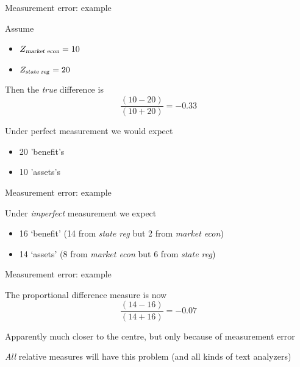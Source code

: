 \documentclass{hertieteaching}
\begin{document}
\begin{frame}{Measurement error: example}
\protect\hypertarget{measurement-error-example-2}{}

Assume

\begin{itemize}
\item
  \(Z_{\text{\textsl{market econ}}} = 10\)\item
  \(Z_{\text{\textsl{state reg}}}=20\)
\end{itemize}

Then the \emph{true} difference is \[\frac{(10-20)}{(10+20)} = -0.33\]

Under perfect measurement we would expect

\begin{itemize}
\item
  20 'benefit's\item
  10 'assets's
\end{itemize}

\end{frame}

\begin{frame}{Measurement error: example}
\protect\hypertarget{measurement-error-example-3}{}

Under \emph{imperfect} measurement we expect

\begin{itemize}
\item
  16 `benefit' (14 from \emph{state reg} but 2 from \emph{market econ})\item
  14 `assets' (8 from \emph{market econ} but 6 from \emph{state reg})
\end{itemize}

\end{frame}

\begin{frame}{Measurement error: example}
\protect\hypertarget{measurement-error-example-4}{}

The proportional difference measure is now \[
\frac{(14-16)}{(14+16)} = -0.07
\]

Apparently much closer to the centre, but only because of measurement
error

\emph{All} relative measures will have this problem (and all kinds of
text analyzers)

\end{frame}
\end{document}

